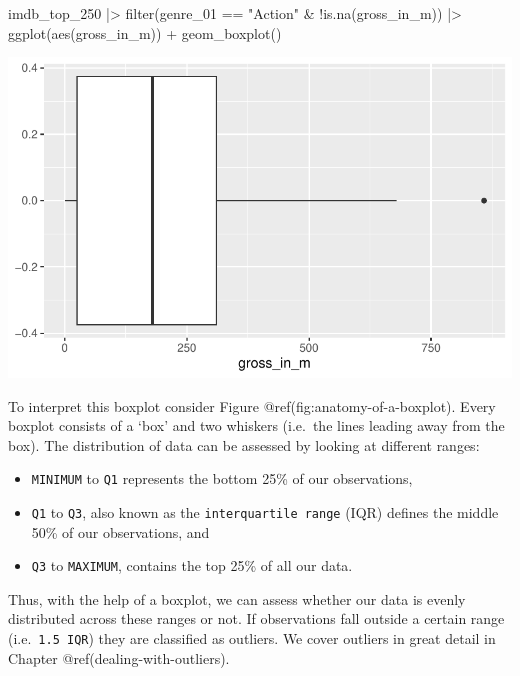 \documentclass[
  letterpaper,
]{krantz}
\makeatletter
\newenvironment{Shaded}{\begin{snugshade}}{\end{snugshade}}
\newcommand{\FunctionTok}[1]{\textcolor[rgb]{0.28,0.35,0.67}{#1}}
\newcommand{\NormalTok}[1]{\textcolor[rgb]{0.00,0.23,0.31}{#1}}
\newcommand{\SpecialCharTok}[1]{\textcolor[rgb]{0.37,0.37,0.37}{#1}}
\newcommand{\StringTok}[1]{\textcolor[rgb]{0.13,0.47,0.30}{#1}}
\newenvironment{kframe}{%
\medskip{}
\setlength{\fboxsep}{.8em}
 \def\at@end@of@kframe{}%
 \ifinner\ifhmode%
  \def\at@end@of@kframe{\end{minipage}}%
  \begin{minipage}{\columnwidth}%
 \fi\fi%
 \def\FrameCommand##1{\hskip\@totalleftmargin \hskip-\fboxsep
 \colorbox{shadecolor}{##1}\hskip-\fboxsep
     \hskip-\linewidth \hskip-\@totalleftmargin \hskip\columnwidth}%
 \MakeFramed {\advance\hsize-\width
   \@totalleftmargin\z@ \linewidth\hsize
   \@setminipage}}%
 {\par\unskip\endMakeFramed%
 \at@end@of@kframe}
\renewenvironment{Shaded}{\begin{kframe}}{\end{kframe}}
\makeatother
\begin{document}
\begin{Shaded}
\begin{Highlighting}[]
\NormalTok{imdb\_top\_250 }\SpecialCharTok{|\textgreater{}}
  \FunctionTok{filter}\NormalTok{(genre\_01 }\SpecialCharTok{==} \StringTok{"Action"} \SpecialCharTok{\&} \SpecialCharTok{!}\FunctionTok{is.na}\NormalTok{(gross\_in\_m)) }\SpecialCharTok{|\textgreater{}}
  \FunctionTok{ggplot}\NormalTok{(}\FunctionTok{aes}\NormalTok{(gross\_in\_m)) }\SpecialCharTok{+}
  \FunctionTok{geom\_boxplot}\NormalTok{()}
\end{Highlighting}
\end{Shaded}

\includegraphics{08_descriptive_statistics_files/figure-pdf/boxplot-action-movies-1.pdf}

To interpret this boxplot consider Figure
@ref(fig:anatomy-of-a-boxplot). Every boxplot consists of a `box' and
two whiskers (i.e.~the lines leading away from the box). The
distribution of data can be assessed by looking at different ranges:

\begin{itemize}
\item
  \texttt{MINIMUM} to \texttt{Q1} represents the bottom 25\% of our
  observations,
\item
  \texttt{Q1} to \texttt{Q3}, also known as the
  \texttt{interquartile\ range} (IQR) defines the middle 50\% of our
  observations, and
\item
  \texttt{Q3} to \texttt{MAXIMUM}, contains the top 25\% of all our
  data.
\end{itemize}

Thus, with the help of a boxplot, we can assess whether our data is
evenly distributed across these ranges or not. If observations fall
outside a certain range (i.e.~\texttt{1.5\ IQR}) they are classified as
outliers. We cover outliers in great detail in Chapter
@ref(dealing-with-outliers).
\end{document}
